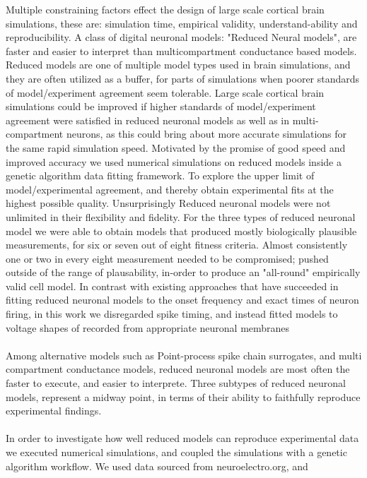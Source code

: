 
Multiple constraining factors effect the design of large scale cortical brain simulations, these are: simulation time, empirical validity, understand-ability and reproducibility. A class of digital neuronal models: "Reduced Neural models", are faster and easier to interpret than multicompartment conductance based models. Reduced models are one of multiple model types used in brain simulations, and they are often utilized as a buffer, for parts of simulations when poorer standards of model/experiment agreement seem tolerable. Large scale cortical brain simulations could be improved if higher standards of model/experiment agreement were satisfied in reduced neuronal models as well as in multi-compartment neurons, as this could bring about more accurate simulations for the same rapid simulation speed. Motivated by the promise of good speed and improved accuracy we used numerical simulations on reduced models inside a genetic algorithm data fitting framework. To explore the upper limit of model/experimental agreement, and thereby obtain experimental fits at the highest possible quality. Unsurprisingly Reduced neuronal models were not unlimited in their flexibility and fidelity. For the three types of reduced neuronal model we were able to obtain models that produced mostly biologically plausible measurements, for six or seven out of eight fitness criteria. Almost consistently one or two in every eight measurement needed to be compromised; pushed outside of the range of plausability, in-order to produce an "all-round" empirically valid cell model. In contrast with existing approaches that have succeeded in fitting reduced neuronal models to the onset frequency and exact times of neuron firing, in this work we disregarded spike timing, and instead fitted models to voltage shapes of recorded from appropriate neuronal membranes\\
\\ 
Among alternative models such as Point-process spike chain surrogates, and  multi compartment conductance models, reduced neuronal models are most often the faster to execute, and easier to interprete. Three subtypes of reduced neuronal models, represent a midway point, in terms of their ability to faithfully reproduce experimental findings.\\
\\
In order to investigate how well reduced models can reproduce experimental data we executed numerical simulations, and coupled the simulations with a genetic algorithm workflow. We used data sourced from neuroelectro.org, and 

